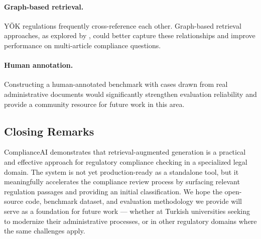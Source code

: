 \paragraph{Graph-based retrieval.}
YÖK regulations frequently cross-reference each other.
Graph-based retrieval approaches, as explored by \citet{Masoudifard2024},
could better capture these relationships and improve performance on
multi-article compliance questions.

\paragraph{Human annotation.}
Constructing a human-annotated benchmark with cases drawn from real
administrative documents would significantly strengthen evaluation reliability
and provide a community resource for future work in this area.

\subsection{Closing Remarks}

ComplianceAI demonstrates that retrieval-augmented generation is a practical
and effective approach for regulatory compliance checking in a specialized
legal domain. The system is not yet production-ready as a standalone tool,
but it meaningfully accelerates the compliance review process by surfacing
relevant regulation passages and providing an initial classification.
We hope the open-source code, benchmark dataset, and evaluation methodology
we provide will serve as a foundation for future work --- whether at Turkish
universities seeking to modernize their administrative processes,
or in other regulatory domains where the same challenges apply.
